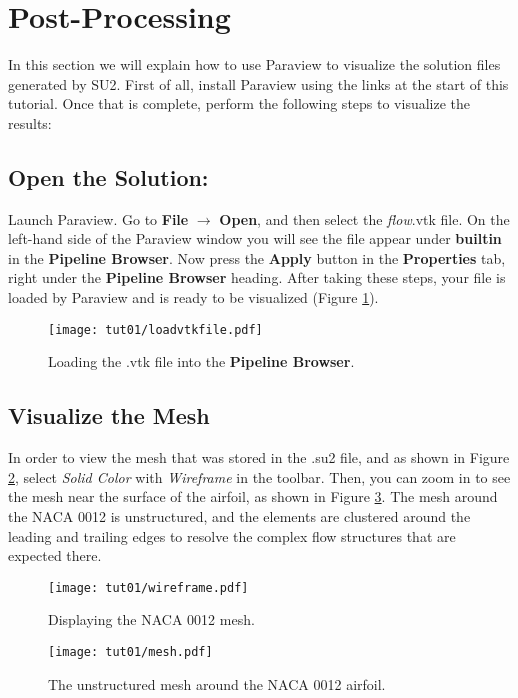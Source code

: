 \section{Post-Processing}
In this section we will explain how to use Paraview to visualize the solution files generated by SU2. First of all, install Paraview using the links at the start of this tutorial. Once that is complete, perform the following steps to visualize the results:
\subsection{Open the Solution:}
Launch Paraview. Go to \textbf{File} $\rightarrow$ \textbf{Open}, and then select the \textit{flow}.vtk file. On the left-hand side of the Paraview window you will see the file appear under \textbf{builtin} in the \textbf{Pipeline Browser}. Now press the \textbf{Apply} button in the \textbf{Properties} tab, right under the \textbf{Pipeline Browser} heading. After taking these steps, your file is loaded by Paraview and is ready to be visualized (Figure \ref{fig1:load}).
\begin{figure}[htbp]
    \centering
    \texttt{[image: tut01/loadvtkfile.pdf]}
    \caption{Loading the .vtk file into the \textbf{Pipeline Browser}.}
    \label{fig1:load}
\end{figure}
\subsection{Visualize the Mesh}
In order to view the mesh that was stored in the .su2 file, and as shown in Figure \ref{fig1:wireframe}, select \textit{Solid Color} with \textit{Wireframe} in the toolbar. Then, you can zoom in to see the mesh near the surface of the airfoil, as shown in Figure \ref{fig1:mesh}. The mesh around the NACA 0012 is unstructured, and the elements are clustered around the leading and trailing edges to resolve the complex flow structures that are expected there.
\begin{figure}[htbp]
    \centering
    \texttt{[image: tut01/wireframe.pdf]}
    \caption{Displaying the NACA 0012 mesh.}
    \label{fig1:wireframe}
\end{figure}
\begin{figure}[htbp]
    \centering
    \texttt{[image: tut01/mesh.pdf]}
    \caption{The unstructured mesh around the NACA 0012 airfoil.}
    \label{fig1:mesh}
\end{figure}
